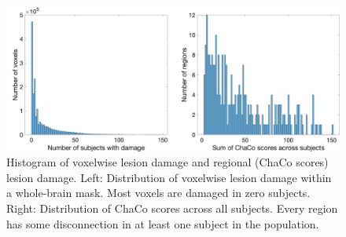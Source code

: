 \documentclass[10pt]{article}
\begin{document}
\begin{figure}[htp]
\centering
\includegraphics[width=1\linewidth]{figures/histogram_voxels_chaco.png}
\caption{Histogram of voxelwise lesion damage and regional (ChaCo scores) lesion damage. Left:  Distribution of voxelwise lesion damage within a whole-brain mask. Most voxels are damaged in zero subjects. Right: Distribution of ChaCo scores across all subjects. Every region has some disconnection in at least one subject in the population. }
\label{histogram_voxels_chaco}
\end{figure}
\end{document}
